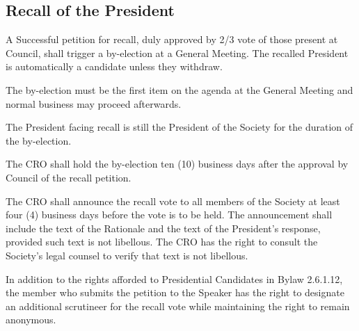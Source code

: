 \subsection{Recall of the President}
\begin{longenum}[ label*=\thesubsection.\arabic*., align=left]
	\item A Successful petition for recall, duly approved by 2/3 vote of those present at Council, shall trigger a by-election at a General Meeting. The recalled President is automatically a candidate unless they withdraw.
    \begin{longenum}[ label*=\arabic*., align=left]
		\item The by-election must be the first item on the agenda at the General Meeting and normal business may proceed afterwards.
	\end{longenum}
	
    \item The President facing recall is still the President of the Society for the duration of the by-election.
    \item The CRO shall hold the by-election ten (10) business days after the approval by Council of the recall petition.
    \item The CRO shall announce the recall vote to all members of the Society at least four (4) business days before the vote is to be held. The announcement shall include the text of the Rationale and the text of the President's response, provided such text is not libellous. The CRO has the right to consult the Society's legal counsel to verify that text is not libellous.
    \item In addition to the rights afforded to Presidential Candidates in Bylaw 2.6.1.12, the member who submits the petition to the Speaker has the right to designate an additional scrutineer for the recall vote while maintaining the right to remain anonymous.
\end{longenum}
